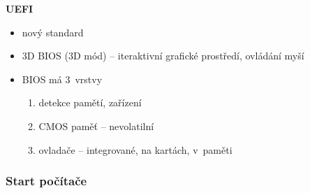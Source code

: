 \documentclass[a4paper,12pt]{article}
\providecommand{\tightlist}{%
\setlength{\itemsep}{0pt}\setlength{\parskip}{0pt}}
\begin{document}
\textbf{UEFI}

\begin{itemize}
  \tightlist
  \item nový standard
  \item 3D BIOS (3D mód) -- iteraktivní grafické prostředí, ovládání myší
\end{itemize}

\begin{itemize}
  \tightlist
  \item BIOS má 3~vrstvy
  \begin{enumerate}
    \item detekce pamětí, zařízení
    \item CMOS paměť -- nevolatilní
    \item ovladače -- integrované, na kartách, v~paměti
  \end{enumerate}
\end{itemize}

\subsubsection{Start počítače}
\end{document}
